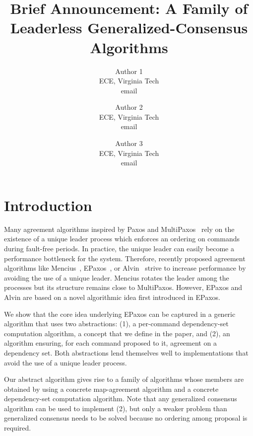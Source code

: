

\title{\vspace{-0.8in}Brief Announcement: A Family of Leaderless Generalized-Consensus Algorithms}

\author{
Author 1\\
ECE, Virginia Tech\\
email
\and
Author 2\\
ECE, Virginia Tech\\
email
\and
Author 3\\
ECE, Virginia Tech\\
email
}

\date{}



\maketitle

%

\section{Introduction}

Many agreement algorithms inspired by Paxos and MultiPaxos~\cite{lamport2001paxos} rely on the existence of a unique leader process which enforces an ordering on commands during fault-free periods.
In practice, the unique leader can easily become a performance bottleneck for the system.
Therefore, recently proposed agreement algorithms like Mencius~\cite{MaoJunqueiraMarzullo08MenciusBuildingEfficientReplicatedStateMachine}, EPaxos~\cite{MoraruAndersenKaminsky13ThereIsMoreConsensusEgalitarianParliaments}, or Alvin~\cite{TurcuETAL14BeGeneralDontGiveUpConsistency} strive to increase performance by avoiding the use of a unique leader.
Mencius rotates the leader among the processes but its structure remains close to MultiPaxos. 
However, EPaxos and Alvin are based on a novel algorithmic idea first introduced in EPaxos.

We show that the core idea underlying EPaxos can be captured in a generic algorithm that uses two abstractions: (1), a per-command dependency-set computation algorithm, a concept that we define in the paper, and (2), an algorithm ensuring, for each command proposed to it, agreement on a dependency set. Both abstractions lend themselves well to implementations that avoid the use of a unique leader process.

Our abstract algorithm gives rise to a family of algorithms whose members are obtained by using a concrete map-agreement algorithm and a concrete dependency-set computation algorithm. 
Note that any generalized consensus algorithm can be used to implement (2), but only a weaker problem than generalized consensus needs to be solved because no ordering among proposal is required.

